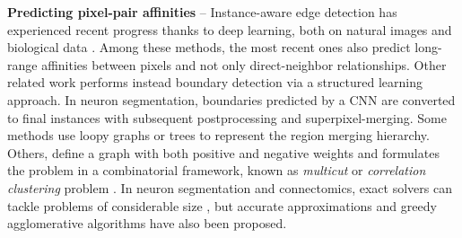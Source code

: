 \textbf{Predicting pixel-pair affinities} --  
Instance-aware edge detection has experienced recent progress thanks to deep learning, both on natural images \cite{Gao_2019_ICCV,liu2018affinity,kirillov2017instancecut,xie2015holistically,kokkinos2015pushing} and biological data \cite{lee2017superhuman,schmidt2018cell,wolf2018mutex,bailoni2019generalized,meirovitch2016multi,ciresan2012deep}. Among these methods, the most recent ones also predict long-range affinities between pixels and not only direct-neighbor relationships.
Other related work \cite{funke2018large,turaga2009maximin} performs instead boundary detection via a structured learning approach.
In neuron segmentation, boundaries predicted by a CNN are converted to final instances with subsequent postprocessing and superpixel-merging.
Some methods use loopy graphs \cite{kaynig2015large,krasowski2015improving} or trees \cite{meirovitch2016multi,liu2016sshmt,liu2014modular,funke2015learning,uzunbas2016efficient,nunez2013machine,knowles2016rhoananet} to represent the region merging hierarchy. 
Others, define a graph with both positive and negative weights and formulates the problem in a combinatorial framework, known as \emph{multicut} or \emph{correlation clustering} problem \cite{kappes2011globally,chopra1991multiway,beier2017multicut}. 
In neuron segmentation and connectomics, exact solvers can tackle problems of considerable size \cite{andres2012globally}, but accurate approximations \cite{pape2017solving,beier2017multicut,beier2016efficient,yarkony2012fast,beier2014cut} and greedy agglomerative algorithms \cite{levinkov2017comparative,wolf2019mutex,bailoni2019generalized} have also been proposed.


